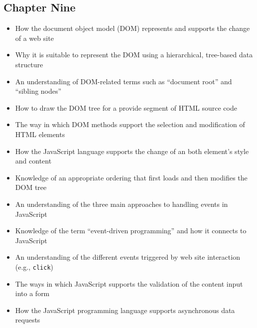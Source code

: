 \documentclass[11pt]{article}
\begin{document}
\vspace*{-.2in}
\subsection*{Chapter Nine}

\begin{itemize}


  \item How the document object model (DOM) represents and supports the
    change of a web site

  \item Why it is suitable to represent the DOM using a hierarchical, tree-based
    data structure

  \item An understanding of DOM-related terms such as ``document root'' and
    ``sibling nodes''

  \item How to draw the DOM tree for a provide segment of HTML source code

  \item The way in which DOM methods support the selection and modification of
    HTML elements

  \item How the JavaScript language supports the change of an both element's
    style and content

  \item Knowledge of an appropriate ordering that first loads and then modifies
    the DOM tree

  \item An understanding of the three main approaches to handling events in
    JavaScript

  \item Knowledge of the term ``event-driven programming'' and how it connects
    to JavaScript

  \item An understanding of the different events triggered by web site
    interaction (e.g., {\tt click})

  \item The ways in which JavaScript supports the validation of the content
    input into a form

  \item How the JavaScript programming language supports asynchronous data
    requests

\end{itemize}
\end{document}
